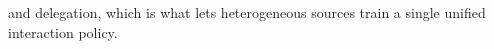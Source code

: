 \documentclass{llmxive}
\begin{document}
and delegation, which is what lets heterogeneous sources train a single unified interaction policy.

\end{document}
